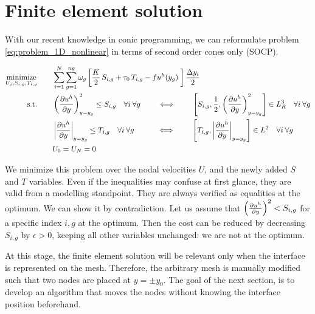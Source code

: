 \documentclass[11 pt]{report}
\begin{document}
\section{Finite element solution}
\label{sec:fem_1D}
With our recent knowledge in conic programming, we can reformulate problem \eqref{eq:problem_1D_nonlinear} in terms of second order cones only (SOCP).
\begin{empheqboxed}
    \begin{equation}
        \begin{aligned}
            \operatorname*{minimize}_{U_j, S_{i, g}, T_{i, g}} \qquad &\sum_{i=1}^N \sum_{g=1}^{ng} \omega_{g} \left[\frac{K}{2} \, S_{i, g} + \tau_0 \, T_{i,g} - f u^h(y_g) \; \right] \frac{\Delta y_i}{2}\\
            \textrm{s.t.} \qquad & \left(\pdv{u^h}{y}\right)^2_{y=y_g} \leq S_{i,g} \quad \forall i \:\forall g \qquad \iff \qquad \left[S_{i,g}, \frac{1}{2}, \left(\pdv{u^h}{y}\right)^2_{y=y_g}\right] \in L_R^{3} \quad \forall i \:\forall g\\
            \qquad & \left|\pdv{u^h}{y}\right|_{y=y_g} \leq T_{i,g} \quad \forall i \:\forall g \qquad\;\;\: \iff \qquad \left[ T_{i,g}, \left|\pdv{u^h}{y}\right|_{y=y_g}\right] \in L^{2} \quad \forall i \:\forall g\\
            \qquad & U_0 = U_N = 0
        \end{aligned}
        \label{eq:problem_1D}
    \end{equation}
\end{empheqboxed}

We minimize this problem over the nodal velocities $U$, and the newly added $S$ and $T$ variables. Even if the inequalities may confuse at first glance, they are valid from a modelling standpoint. They are always verified as equalities at the optimum. We can show it by contradiction. Let us assume that $\left(\pdv{u^h}{y}\right)^2 < S_{i,g}$ for a specific index $i,g$ at the optimum. Then the cost can be reduced by decreasing $S_{i,g}$ by $\epsilon > 0$, keeping all other variables unchanged: we are not at the optimum. %

At this stage, the finite element solution will be relevant only when the interface is represented on the mesh. Therefore, the arbitrary mesh is manually modified such that two nodes are placed at $y=\pm y_0$. The goal of the next section, is to develop an algorithm that moves the nodes without knowing the interface position beforehand.
\end{document}
